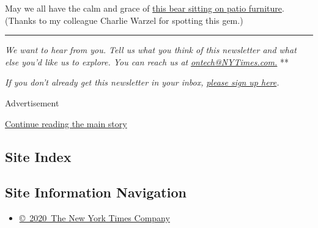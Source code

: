 May we all have the calm and grace of
\href{https://twitter.com/k_thompson212/status/1285240819608424448}{this
bear sitting on patio furniture}. (Thanks to my colleague Charlie Warzel
for spotting this gem.)

\begin{center}\rule{0.5\linewidth}{\linethickness}\end{center}

\emph{We want to hear from you. Tell us what you think of this
newsletter and what else you'd like us to explore. You can reach us at}
\href{mailto:ontech@NYTimes.com?subject=On\%20Tech\%20Feedback}{\emph{ontech@NYTimes.com.}}
**

\emph{If you don't already get this newsletter in your inbox,}
\href{https://www.nytimes3xbfgragh.onion/newsletters/signup/OT}{\emph{please
sign up here}}\emph{.}

Advertisement

\protect\hyperlink{after-bottom}{Continue reading the main story}

\hypertarget{site-index}{%
\subsection{Site Index}\label{site-index}}

\hypertarget{site-information-navigation}{%
\subsection{Site Information
Navigation}\label{site-information-navigation}}

\begin{itemize}
\tightlist
\item
  \href{https://help.nytimes3xbfgragh.onion/hc/en-us/articles/115014792127-Copyright-notice}{©~2020~The
  New York Times Company}
\end{itemize}

